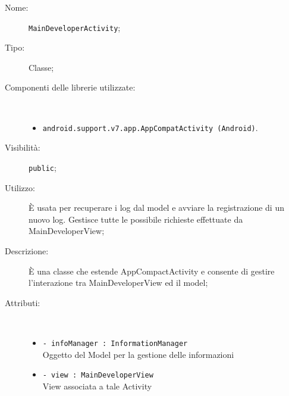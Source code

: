 \documentclass[../DefinizioneDiProdotto.tex]{subfiles}
\begin{document}
\begin{description}
	\item[Nome:] \texttt{MainDeveloperActivity};
	\item[Tipo:] Classe;
	\item[Componenti delle librerie utilizzate:] \
	\begin{itemize}
		\item \texttt{android.support.v7.app.AppCompatActivity (Android)}.
		
	\end{itemize}
	\item[Visibilità:] \texttt{public};
	\item[Utilizzo:] È usata per recuperare i log dal model e avviare la registrazione di un nuovo log. Gestisce tutte le possibile richieste effettuate da MainDeveloperView;
	\item[Descrizione:] È una classe che estende AppCompactActivity e consente di gestire l'interazione tra MainDeveloperView ed il model;
	\item[Attributi:] \
	\begin{itemize}
		\item \texttt{- infoManager : InformationManager}\\
		Oggetto del Model per la gestione delle informazioni
		
		\item \texttt{- view : MainDeveloperView}\\
		View associata a tale Activity
		

\end{itemize}
\end{description}
\end{document}
